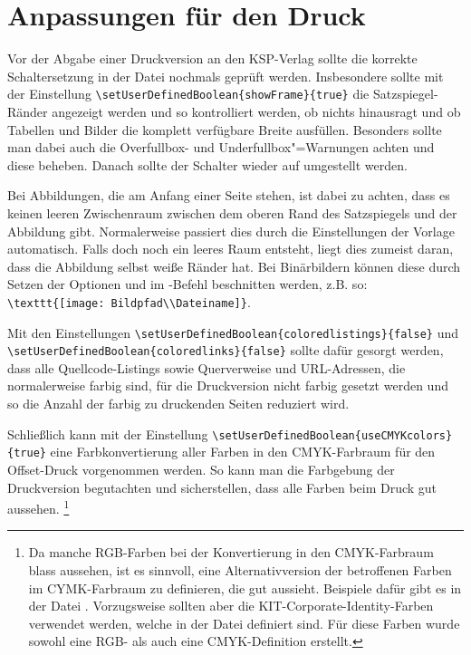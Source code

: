 \section[Anpassungen für den Druck]{Anpassungen für den Druck}%
%
\label{sec:Druckanpassungen}
%
Vor der Abgabe einer Druckversion an den KSP-Verlag sollte die korrekte Schaltersetzung in der Datei  nochmals geprüft werden.
Insbesondere sollte mit der Einstellung
\lstinline|\setUserDefinedBoolean{showFrame}{true}|
die Satzspiegel-Ränder angezeigt werden und so kontrolliert werden,
ob nichts hinausragt und ob Tabellen und Bilder die komplett verfügbare Breite ausfüllen.
Besonders sollte man dabei auch die Overfullbox- und Underfullbox"=Warnungen achten und diese beheben.
Danach sollte der Schalter wieder auf  umgestellt werden.

Bei Abbildungen, die am Anfang einer Seite stehen, ist dabei zu achten,
dass es keinen leeren Zwischenraum zwischen dem oberen Rand des Satzspiegels und der Abbildung gibt.
Normalerweise passiert dies durch die Einstellungen der Vorlage automatisch.
Falls doch noch ein leeres Raum entsteht, liegt dies zumeist daran, dass die Abbildung selbst weiße Ränder hat.
Bei Binärbildern können diese durch Setzen der Optionen
 und 
im -Befehl beschnitten werden, z.B. so:
\lstinline|\texttt{[image: Bildpfad\\Dateiname]}|.

Mit den Einstellungen 
\lstinline|\setUserDefinedBoolean{coloredlistings}{false}| und 
\lstinline|\setUserDefinedBoolean{coloredlinks}{false}|
sollte dafür gesorgt werden, dass alle Quellcode-Listings sowie Querverweise und URL-Adressen,
die normalerweise farbig sind, für die Druckversion nicht farbig gesetzt werden
und so die Anzahl der farbig zu druckenden Seiten reduziert wird.

Schließlich kann mit der Einstellung
\lstinline|\setUserDefinedBoolean{useCMYKcolors}{true}|
eine Farbkonvertierung aller Farben in den CMYK-Farbraum für den Offset-Druck vorgenommen werden.
So kann man die Farbgebung der Druckversion begutachten und sicherstellen, dass alle Farben beim Druck gut aussehen.%
\footnote{Da manche RGB-Farben bei der Konvertierung in den CMYK-Farbraum blass aussehen,
ist es sinnvoll, eine Alternativversion der betroffenen Farben im CYMK-Farbraum zu definieren,
die gut aussieht.
Beispiele dafür gibt es in der Datei .
Vorzugsweise sollten aber die KIT-Corporate-Identity-Farben verwendet werden,
welche in der Datei  definiert sind.
Für diese Farben wurde sowohl eine RGB- als auch eine CMYK-Definition erstellt.}